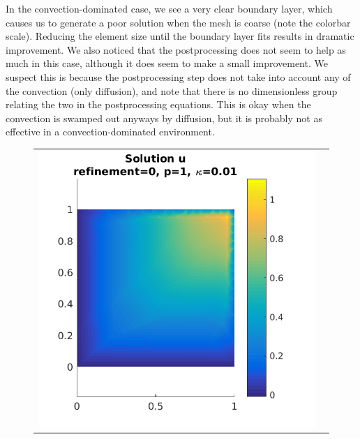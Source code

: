 \documentclass{article}
\begin{document}
In the convection-dominated case, we see a very clear boundary layer, which causes us to generate a poor solution when the mesh is coarse (note the colorbar scale).
Reducing the element size until the boundary layer fits results in dramatic improvement.
We also noticed that the postprocessing does not seem to help as much in this case, although it does seem to make a small improvement.
We suspect this is because the postprocessing step does not take into account any of the convection (only diffusion), and note that there is no dimensionless group relating the two in the postprocessing equations.
This is okay when the convection is swamped out anyways by diffusion, but it is probably not as effective in a convection-dominated environment.

\begin{figure}[!ht]
\centering
\begin{tabular}{c c}
\includegraphics[scale=0.7]{umu_113.png} & 

\end{tabular}
\end{figure}
\end{document}

